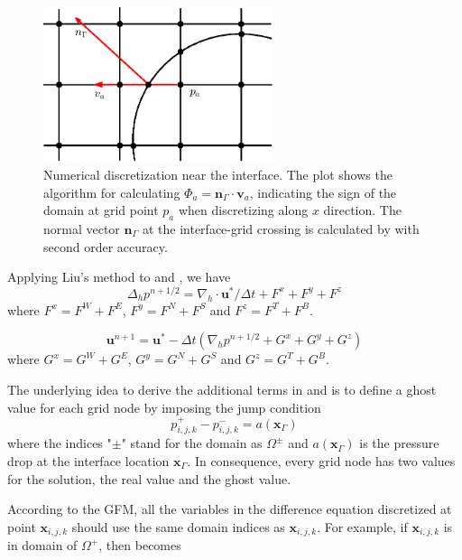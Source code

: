 \begin{figure}[] \centering
\includegraphics[width=0.6\textwidth]{Figures/grid.eps}
\caption{Numerical discretization near the interface. The plot
shows the algorithm for calculating
$\Phi_a = \mathbf{n}_\Gamma\cdot \mathbf{v}_a$, indicating the sign of the
domain at grid point $p_a$ when discretizing along $x$ direction. The normal
vector $\mathbf{n}_\Gamma$ at the interface-grid crossing is calculated by
\FronTierp with second order accuracy.}
\label{grid}
\end{figure}

Applying Liu's method to  and , we have
\begin{equation} \Delta_h p^{n+1/2}
= \nabla_h\cdot \mathbf{u}^*/\Delta t + F^x + F^y + F^z \label{newLap}
\end{equation} where $F^x = F^W + F^E$, $F^y = F^N + F^S$ and $F^z = F^T + F^B$.

\begin{equation} \label{newGrad} \mathbf{u}^{n+1} = \mathbf{u}^* - \Delta
t(\nabla_h p^{n+1/2} + G^x + G^y + G^z) \end{equation} where $G^x = G^W + G^E$,
$G^y = G^N + G^S$ and $G^z = G^T + G^B$.

The underlying idea to derive the additional terms in  and
 is to define a ghost value for each grid node by imposing the jump
condition
\begin{equation} p_{i,j,k}^+ - p_{i,j,k}^- = a(\mathbf{x}_{\Gamma})
\label{disJump} \end{equation} where the indices "$\pm$" stand for the domain as
$\Omega^{\pm}$ and $a(\mathbf{x}_{\Gamma})$ is the pressure drop at the
interface location $\mathbf{x}_{\Gamma}$.  In consequence, every grid node has
two values for the solution, the real value and the ghost value.

According to the GFM, all the variables in the difference equation discretized
at point $\mathbf{x}_{i,j,k}$ should use the same domain indices as $\mathbf{x}_{i,j,k}$.
For example, if $\mathbf{x}_{i,j,k}$ is in domain of $\Omega^+$, then  becomes

